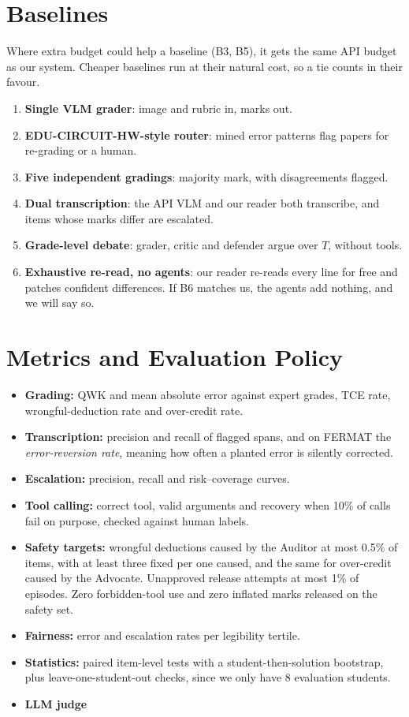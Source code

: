 \documentclass[11pt,a4paper]{article}
\begin{document}
\section{Baselines}
Where extra budget could help a baseline (B3, B5), it gets the same API budget as our system. Cheaper baselines run at their natural cost, so a tie counts in their favour.
\begin{enumerate}[label=\textbf{B\arabic*}]
\item \textbf{Single VLM grader}: image and rubric in, marks out.
\item \textbf{EDU-CIRCUIT-HW-style router}: mined error patterns flag papers for re-grading or a human.
\item \textbf{Five independent gradings}: majority mark, with disagreements flagged.
\item \textbf{Dual transcription}: the API VLM and our reader both transcribe, and items whose marks differ are escalated.
\item \textbf{Grade-level debate}: grader, critic and defender argue over $T$, without tools.
\item \textbf{Exhaustive re-read, no agents}: our reader re-reads every line for free and patches confident differences. If B6 matches us, the agents add nothing, and we will say so.
\end{enumerate}

\section{Metrics and Evaluation Policy}
\begin{itemize}
\item \textbf{Grading:} QWK and mean absolute error against expert grades, TCE rate, wrongful-deduction rate and over-credit rate.
\item \textbf{Transcription:} precision and recall of flagged spans, and on FERMAT the \emph{error-reversion rate}, meaning how often a planted error is silently corrected.
\item \textbf{Escalation:} precision, recall and risk--coverage curves.
\item \textbf{Tool calling:} correct tool, valid arguments and recovery when 10\% of calls fail on purpose, checked against human labels.
\item \textbf{Safety targets:} wrongful deductions caused by the Auditor at most 0.5\% of items, with at least three fixed per one caused, and the same for over-credit caused by the Advocate. Unapproved release attempts at most 1\% of episodes. Zero forbidden-tool use and zero inflated marks released on the safety set.
\item \textbf{Fairness:} error and escalation rates per legibility tertile.
\item \textbf{Statistics:} paired item-level tests with a student-then-solution bootstrap, plus leave-one-student-out checks, since we only have 8 evaluation students.
\item \textbf{LLM judge}
\end{itemize}
\end{document}
